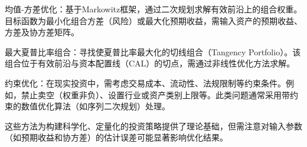 均值-方差优化：基于Markowitz框架，通过二次规划求解有效前沿上的组合权重。目标函数为最小化组合方差（风险）或最大化预期收益，需输入资产的预期收益、方差及协方差矩阵。

最大夏普比率组合：寻找使夏普比率最大化的切线组合（Tangency Portfolio）。该组合位于有效前沿与资本配置线（CAL）的切点，需通过非线性优化方法求解。

约束优化：在现实投资中，需考虑交易成本、流动性、法规限制等约束条件。例如，禁止卖空（权重非负）、设置行业或资产类别上限等。此类问题通常采用带约束的数值优化算法（如序列二次规划）处理。

这些方法为构建科学化、定量化的投资策略提供了理论基础，但需注意对输入参数（如预期收益和协方差）的估计误差可能显著影响优化结果。